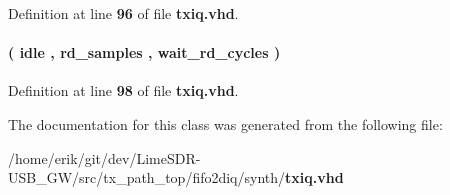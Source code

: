 Definition at line {\bf 96} of file {\bf txiq.\+vhd}.

\paragraph[{state\+\_\+type}]{ {\bfseries \textcolor{vhdlchar}{(}\textcolor{vhdlchar}{ }\textcolor{vhdlchar}{idle}\textcolor{vhdlchar}{ }\textcolor{vhdlchar}{,}\textcolor{vhdlchar}{ }\textcolor{vhdlchar}{rd\+\_\+samples}\textcolor{vhdlchar}{ }\textcolor{vhdlchar}{,}\textcolor{vhdlchar}{ }\textcolor{vhdlchar}{wait\+\_\+rd\+\_\+cycles}\textcolor{vhdlchar}{ }\textcolor{vhdlchar}{)}\textcolor{vhdlchar}{ }} \hspace{0.3cm}{\ttfamily [Type]}}\label{classtxiq_1_1arch_acb2288907c08100d7187e75156fb0751}


Definition at line {\bf 98} of file {\bf txiq.\+vhd}.



The documentation for this class was generated from the following file\+:\begin{DoxyCompactItemize}
\item 
/home/erik/git/dev/\+Lime\+S\+D\+R-\/\+U\+S\+B\+\_\+\+G\+W/src/tx\+\_\+path\+\_\+top/fifo2diq/synth/{\bf txiq.\+vhd}\end{DoxyCompactItemize}
